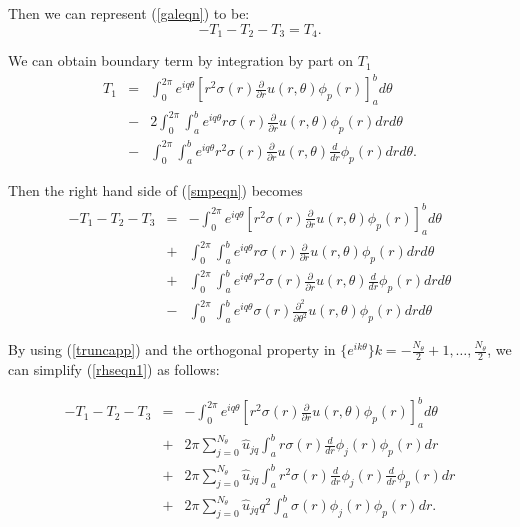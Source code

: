 Then we can represent (\ref{galeqn}) to be:
\begin{equation}\label{smpeqn}
- T_1 - T_2 - T_3 = T_4.
\end{equation}

We can obtain boundary term by integration by part on $T_1$
\begin{eqnarray}
T_1 &=& \int_0^{2\pi}e^{iq\theta} \left[ r^2\sigma(r)\frac{\partial}{\partial r}u(r,\theta)\phi_p(r)\right]_a^b d\theta \\
&-&2 \int_0^{2\pi}\int_a^b e^{iq\theta} r \sigma(r)\frac{\partial}{\partial r}u(r,\theta)\phi_p(r)drd\theta \\
&-& \int_0^{2\pi}\int_a^b e^{iq\theta} r^2\sigma(r)\frac{\partial}{\partial r}u(r,\theta) \frac{d}{dr}\phi_p(r)drd\theta.
\end{eqnarray}

Then the right hand side of (\ref{smpeqn}) becomes
\begin{eqnarray}\label{rhseqn1}
- T_1 - T_2 - T_3 &=& - \int_0^{2\pi}e^{iq\theta} \left[ r^2\sigma(r)\frac{\partial}{\partial r}u(r,\theta)\phi_p(r)\right]_a^b d\theta \\
&+& \int_0^{2\pi}\int_a^b e^{iq\theta} r \sigma(r) \frac{\partial}{\partial r}u(r,\theta)\phi_p(r)drd\theta \\
&+& \int_0^{2\pi}\int_a^b e^{iq\theta} r^2 \sigma(r) \frac{\partial}{\partial r}u(r,\theta) \frac{d}{dr}\phi_p(r)drd\theta \\
&-& \int_0^{2\pi}\int_a^b e^{iq\theta} \sigma(r) \frac{\partial^2}{\partial \theta^2}u(r, \theta) \phi_p(r) dr d\theta
\end{eqnarray}

By using (\ref{truncapp}) and the orthogonal property in
$\{e^{ik\theta}\}k = -\frac{N_\theta}{2}+1,\ldots,\frac{N_\theta}{2}$,
we can simplify (\ref{rhseqn1}) as follows:

\begin{eqnarray}\label{rhseqn2}
- T_1 - T_2 - T_3 &=& - \int_0^{2\pi}e^{iq\theta} \left[ r^2\sigma(r)\frac{\partial}{\partial r}u(r,\theta)\phi_p(r)\right]_a^b d\theta \\
&+& 2\pi \sum_{j=0}^{N_\theta} \hat{u}_{jq} \int_a^b r \sigma(r) \frac{d}{dr} \phi_j(r) \phi_p(r) dr \\
&+& 2\pi \sum_{j=0}^{N_\theta} \hat{u}_{jq} \int_a^b r^2 \sigma(r) \frac{d}{dr} \phi_j(r) \frac{d}{dr}\phi_p(r) dr \\
&+& 2\pi \sum_{j=0}^{N_\theta} \hat{u}_{jq} q^2 \int_a^b \sigma(r) \phi_j(r) \phi_p(r) dr.
\end{eqnarray}


